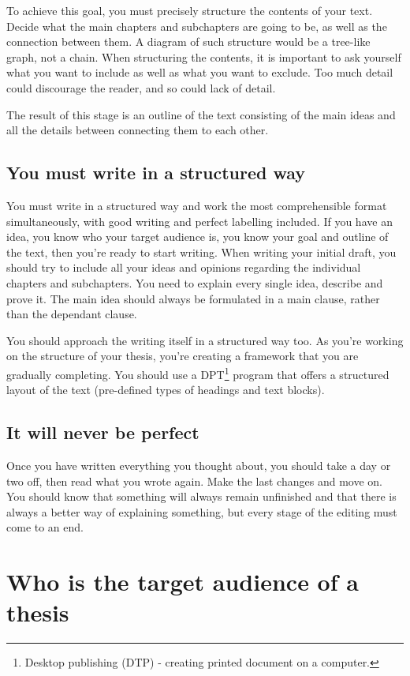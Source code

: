 To achieve this goal, you must precisely structure the contents of your text. Decide what the main chapters and subchapters are going to be, as well as the connection between them. A diagram of such structure would be a tree-like graph, not a chain. When structuring the contents, it is important to ask yourself what you want to include as well as what you want to exclude. Too much detail could discourage the reader, and so could lack of detail.

The result of this stage is an outline of the text consisting of the main ideas and all the details between connecting them to each other.

\subsection*{You must write in a structured way}

You must write in a structured way and work the most comprehensible format simultaneously, with good writing and perfect labelling included. If you have an idea, you know who your target audience is, you know your goal and outline of the text, then you're ready to start writing. When writing your initial draft, you should try to include all your ideas and opinions regarding the individual chapters and subchapters. You need to explain every single idea, describe and prove it. The main idea should always be formulated in a main clause, rather than the dependant clause.

You should approach the writing itself in a structured way too. As you're working on the structure of your thesis, you're creating a framework that you are gradually completing. You should use a DPT\footnote{Desktop publishing (DTP) - creating printed document on a computer.} program that offers a structured layout of the text (pre-defined types of headings and text blocks).

\subsection*{It will never be perfect}
Once you have written everything you thought about, you should take a day or two off, then read what you wrote again. Make the last changes and move on. You should know that something will always remain unfinished and that there is always a better way of explaining something, but every stage of the editing must come to an end.

\section{Who is the target audience of a thesis}

